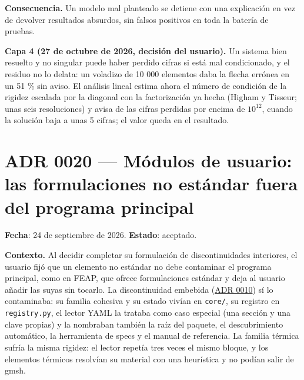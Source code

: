 \documentclass[11pt,oneside]{report}
\begin{document}
\textbf{Consecuencia.} Un modelo mal planteado se detiene con una explicación en vez de devolver resultados absurdos, sin falsos positivos en toda la batería de pruebas.

\textbf{Capa 4 (27 de octubre de 2026, decisión del usuario).} Un sistema bien resuelto y no singular puede haber perdido cifras si está mal condicionado, y el residuo no lo delata: un voladizo de 10 000 elementos daba la flecha errónea en un 51 \% sin aviso. El análisis lineal estima ahora el número de condición de la rigidez escalada por la diagonal con la factorización ya hecha (Higham y Tisseur; unas seis resoluciones) y avisa de las cifras perdidas por encima de $10^{12}$, cuando la solución baja a unas 5 cifras; el valor queda en el resultado.

\section{ADR 0020 --- Módulos de usuario: las formulaciones no estándar fuera del programa principal}
\label{adr:0020}

\textbf{Fecha}: 24 de septiembre de 2026. \textbf{Estado}: aceptado.

\textbf{Contexto.} Al decidir completar su formulación de discontinuidades interiores, el usuario fijó que un elemento no estándar no debe contaminar el programa principal, como en FEAP, que ofrece formulaciones estándar y deja al usuario añadir las suyas sin tocarlo. La discontinuidad embebida (\hyperref[adr:0010]{ADR 0010}) sí lo contaminaba: su familia cohesiva y su estado vivían en \texttt{core/}, su registro en \texttt{registry.py}, el lector YAML la trataba como caso especial (una sección y una clave propias) y la nombraban también la raíz del paquete, el descubrimiento automático, la herramienta de specs y el manual de referencia. La familia térmica sufría la misma rigidez: el lector repetía tres veces el mismo bloque, y los elementos térmicos resolvían su material con una heurística y no podían salir de gmsh.
\end{document}
